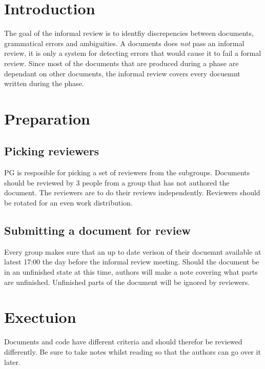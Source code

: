 \documentclass{article}
\date {#1}
\title {
        \documentNumber {10}    
    
    \documentVersion {1}
    
    \documentTitle {Informal Review Protocol}
    \documentGroup {2}
    
    \documentResponsible {Project management group}
    \documentAuthors {Project management group}
    
    \documentDate {2021-01-31}
}
\begin{document}
\maketitle
\thispagestyle{empty}

\newpage

\tableofcontents

\newpage


\section{Introduction}
    The goal of the informal review is to identfiy discrepencies between documents, grammatical errors and ambiguities. A documents does \emph{not} pass an informal review, it is only a system for detecting errors that would cause it to fail a formal review.  
    Since most of the documents that are produced during a phase are dependant on other documents, the informal review covers every docuemnt written during the phase.

\section{Preparation}
    \subsection{Picking reviewers}
        PG is resposible for picking a set of reviewers from the subgroups. Documents should be reviewed by 3 people from a group that has not authored the document. The reviewers are to do their reviews independently. Reviewers should be rotated for an even work distribution.

    \subsection{Submitting a document for review}
        Every group makes sure that an up to date verison of their docuemnt
        available at latest 17:00 the day before the informal review meeting. Should the document be in an unfinished state at this time, authors will make a note covering what parts are unfinished. Unfinished parts of the document will be ignored by reviewers. 

\newpage
\section{Exectuion}
    Documents and code have different criteria and should therefor be reviewed differently. Be sure to take notes whilst reading so that the authors can go over it later. 
    
\end{document}
